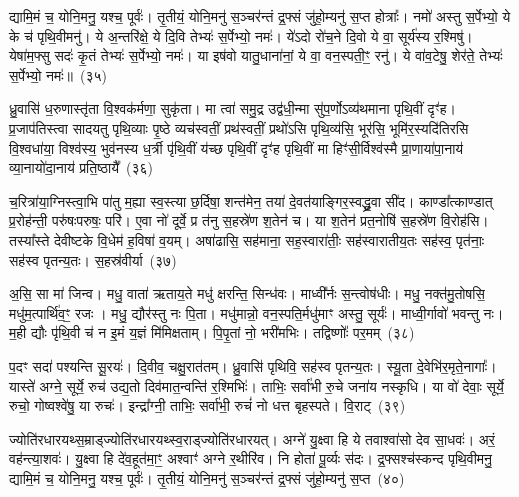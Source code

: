 द्यामि॒मं च॒ योनि॒मनु॒ यश्च॒ पूर्वः॑। तृ॒तीयं॒ योनि॒मनु॑ स॒ञ्चर॑न्तं द्र॒फ्सं जु॑हो॒म्यनु॑ स॒प्त होत्राः᳚। नमो॑ अस्तु स॒र्पेभ्यो॒ ये के च॑ पृथि॒वीमनु॑। ये अ॒न्तरि॑क्षे॒ ये दि॒वि तेभ्यः॑ स॒र्पेभ्यो॒ नमः॑। ये॑\-ऽदो रो॑च॒ने दि॒वो ये वा॒ सूर्य॑स्य र॒श्मिषु॑। येषा॑म॒फ्सु सदः॑ कृ॒तं तेभ्यः॑ स॒र्पेभ्यो॒ नमः॑। या इष॑वो यातु॒धाना॑नां॒ ये वा॒ वन॒स्पती॒ꣳ॒ रनु॑। ये वा॑व॒टेषु॒ शेर॑ते॒ तेभ्यः॑ स॒र्पेभ्यो॒ नमः॑॥~(३५)

{\anuvakamend[{म॒हो\-ऽनु॑ यातु॒धाना॑ना॒मेका॑\-दश च}]}%

ध्रु॒वासि॑ ध॒रुणास्तृ॑ता वि॒श्वक॑र्मणा॒ सुकृ॑ता। मा त्वा॑ समु॒द्र उद्व॑धी॒न्मा सु॑प॒र्णो\-ऽव्य॑थमाना पृथि॒वीं दृꣳ॑ह। प्र॒जा\-प॑तिस्त्वा सादयतु पृथि॒व्याः पृ॒ष्ठे व्यच॑स्वतीं॒ प्रथ॑स्वतीं॒ प्रथो॑\-ऽसि पृथि॒व्य॑सि॒ भूर॑सि॒ भूमि॑र॒स्यदि॑तिरसि वि॒श्वधा॑या॒ विश्व॑स्य॒ भुव॑नस्य ध॒र्त्री पृ॑थि॒वीं य॑च्छ पृथि॒वीं दृꣳ॑ह पृथि॒वीं मा हिꣳ॑सी॒र्विश्व॑स्मै प्रा॒णाया॑पा॒नाय॑ व्या॒नायो॑दा॒नाय॑ प्रति॒ष्ठायै᳚~(३६)

च॒रित्रा॑या॒ग्निस्त्वा॒भि पा॑तु म॒ह्या स्व॒स्त्या छ॒र्दिषा॒ शन्त॑मेन॒ तया॑ दे॒वत॑याङ्गिर॒स्वद्ध्रु॒वा सी॑द। काण्डा᳚त्काण्डात् प्र॒रोह॑न्ती॒ परु॑षःपरुषः॒ परि॑। ए॒वा नो॑ दूर्वे॒ प्र त॑नु स॒हस्रे॑ण श॒तेन॑ च। या श॒तेन॑ प्रत॒नोषि॑ स॒हस्रे॑ण वि॒रोह॑सि। तस्या᳚स्ते देवीष्टके वि॒धेम॑ ह॒विषा॑ व॒यम्। अषा॑ढासि॒ सह॑माना॒ सह॒स्वारा॑तीः॒ सह॑स्वारातीय॒तः सह॑स्व॒ पृत॑नाः॒ सह॑स्व पृतन्य॒तः। स॒हस्र॑वीर्या~(३७)

अ॒सि॒ सा मा॑ जिन्व। मधु॒ वाता॑ ऋताय॒ते मधु॑ क्षरन्ति॒ सिन्ध॑वः। माध्वी᳚र्नः स॒न्त्वोष॑धीः। मधु॒ नक्त॑मु॒तोषसि॒ मधु॑म॒त्पार्थि॑व॒ꣳ॒ रजः। मधु॒ द्यौर॑स्तु नः पि॒ता। मधु॑मान्नो॒ वन॒स्पति॒र्मधु॑माꣳ अस्तु॒ सूर्यः॑। माध्वी॒र्गावो॑ भवन्तु नः। म॒ही द्यौः पृ॑थि॒वी च॑ न इ॒मं य॒ज्ञं मि॑मिक्षताम्। पि॒पृ॒तां नो॒ भरी॑मभिः। तद्विष्णोः᳚ पर॒मम्~(३८)

प॒दꣳ सदा॑ पश्यन्ति सू॒रयः॑। दि॒वीव॒ चक्षु॒रात॑तम्। ध्रु॒वासि॑ पृथिवि॒ सह॑स्व पृतन्य॒तः। स्यू॒ता दे॒वेभि॑र॒मृते॒नागाः᳚। यास्ते॑ अग्ने॒ सूर्ये॒ रुच॑ उद्य॒तो दिव॑मात॒न्वन्ति॑ र॒श्मिभिः॑। ताभिः॒ सर्वा॑भी रु॒चे जना॑य नस्कृधि। या वो॑ देवाः॒ सूर्ये॒ रुचो॒ गोष्वश्वे॑षु॒ या रुचः॑। इन्द्रा᳚ग्नी॒ ताभिः॒ सर्वा॑भी॒ रुचं॑ नो धत्त बृहस्पते। वि॒राट्~(३९)

ज्योति॑रधारयथ्स॒म्राड्ज्योति॑रधारयथ्स्व॒राड्ज्योति॑रधारयत्। अग्ने॑ यु॒क्ष्वा हि ये तवाश्वा॑सो देव सा॒धवः॑। अरं॒ वह॑न्त्या॒शवः॑। यु॒क्ष्वा हि दे॑व॒हूत॑मा॒ꣳ॒ अश्वाꣳ॑ अग्ने र॒थीरि॑व। नि होता॑ पू॒र्व्यः स॑दः। द्र॒फ्सश्च॑स्कन्द पृथि॒वीमनु॒ द्यामि॒मं च॒ योनि॒मनु॒ यश्च॒ पूर्वः॑। तृ॒तीयं॒ योनि॒मनु॑ स॒ञ्चर॑न्तं द्र॒फ्सं जु॑हो॒म्यनु॑ स॒प्त~(४०)

